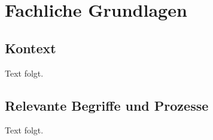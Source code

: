 \chapter{Fachliche Grundlagen}

\section{Kontext}
Text folgt.

\section{Relevante Begriffe und Prozesse}
Text folgt.
